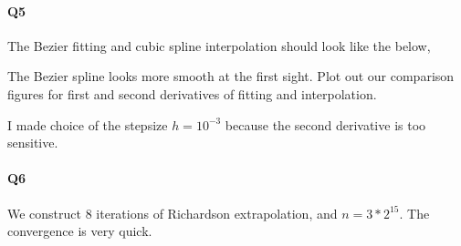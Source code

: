 \documentclass[11pt]{article}
\begin{document}
\paragraph{Q5}
The Bezier fitting and cubic spline interpolation should look like the below,
\begin{figure}[H]
	\centering
\end{figure}
The Bezier spline looks more smooth at the first sight.
Plot out our comparison figures for first and second derivatives of fitting and interpolation.
\begin{figure}[H]
	\centering
\end{figure}
I made choice of the stepsize $h=10^{-3}$ because the second derivative is too sensitive.
\paragraph{Q6}
We construct 8 iterations of Richardson extrapolation, and $n=3*2^{15}$. The convergence is very quick.
\begin{figure}[H]
	\centering
\end{figure}
\end{document}
